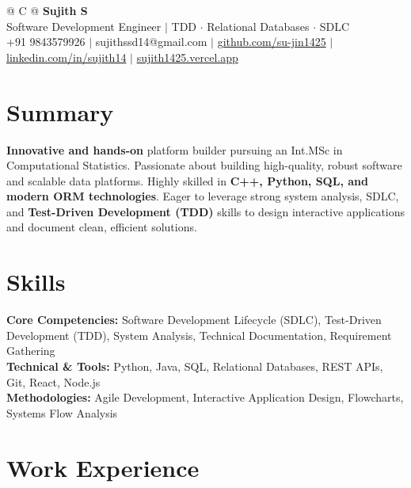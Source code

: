 \documentclass[a4paper,11pt]{article}
\newcommand{\ulink}[2]{\href{#1}{#2}}
\begin{document}
\pagestyle{empty}

\begin{tabularx}{\linewidth}{@{} C @{}}
{\color[HTML]{000000}\fontsize{30}{35}\selectfont\bfseries Sujith S} \\[5pt]
{\fontsize{10.5}{12.5}\selectfont\color[HTML]{3A3A3A}
Software Development Engineer $|$ TDD $\cdot$ Relational Databases $\cdot$ SDLC} \\[6pt]
{\fontsize{9.5}{11.5}\selectfont\textcolor[HTML]{3A3A3A}{+91 9843579926 $|$ sujithssd14@gmail.com $|$ \ulink{https://github.com/su-jin1425}{github.com/su-jin1425} $|$ \ulink{https://linkedin.com/in/sujith14}{linkedin.com/in/sujith14} $|$ \ulink{https://sujith1425.vercel.app}{sujith1425.vercel.app}}}
\end{tabularx}

\section{Summary}
\vspace{2pt}

{\color[HTML]{0A0A0A}\fontsize{11}{14}\selectfont
\textbf{Innovative and hands-on} platform builder pursuing an Int.MSc in Computational Statistics. Passionate about building high-quality, robust software and scalable data platforms. Highly skilled in \textbf{C++, Python, SQL, and modern ORM technologies}. Eager to leverage strong system analysis, SDLC, and \textbf{Test-Driven Development (TDD)} skills to design interactive applications and document clean, efficient solutions.}

\section{Skills}
\vspace{2pt}

{\color[HTML]{0A0A0A}\fontsize{11}{14}\selectfont
\textbf{Core Competencies:} Software Development Lifecycle (SDLC), Test-Driven Development (TDD), System Analysis, Technical Documentation, Requirement Gathering \\[2pt]
\textbf{Technical \& Tools:} Python, Java, SQL, Relational Databases, REST APIs, Git, React, Node.js \\[2pt]
\textbf{Methodologies:} Agile Development, Interactive Application Design, Flowcharts, Systems Flow Analysis}

\section{Work Experience}
\vspace{2pt}
\end{document}
